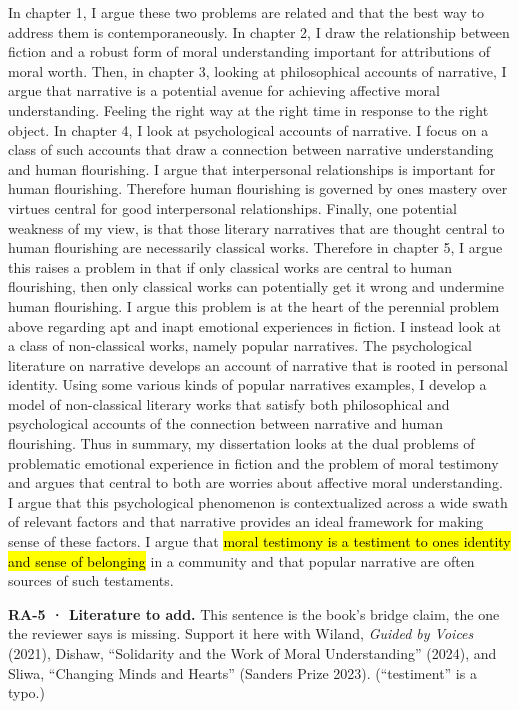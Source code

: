 \documentclass[
  letterpaper,
  DIV=11,
  numbers=noendperiod]{scrartcl}
\theoremstyle{remark}
\begin{document}
In chapter 1, I argue these two problems are related and that the best
way to address them is contemporaneously. In chapter 2, I draw the
relationship between fiction and a robust form of moral understanding
important for attributions of moral worth. Then, in chapter 3, looking
at philosophical accounts of narrative, I argue that narrative is a
potential avenue for achieving affective moral understanding. Feeling
the right way at the right time in response to the right object. In
chapter 4, I look at psychological accounts of narrative. I focus on a
class of such accounts that draw a connection between narrative
understanding and human flourishing. I argue that interpersonal
relationships is important for human flourishing. Therefore human
flourishing is governed by ones mastery over virtues central for good
interpersonal relationships. Finally, one potential weakness of my view,
is that those literary narratives that are thought central to human
flourishing are necessarily classical works. Therefore in chapter 5, I
argue this raises a problem in that if only classical works are central
to human flourishing, then only classical works can potentially get it
wrong and undermine human flourishing. I argue this problem is at the
heart of the perennial problem above regarding apt and inapt emotional
experiences in fiction. I instead look at a class of non-classical
works, namely popular narratives. The psychological literature on
narrative develops an account of narrative that is rooted in personal
identity. Using some various kinds of popular narratives examples, I
develop a model of non-classical literary works that satisfy both
philosophical and psychological accounts of the connection between
narrative and human flourishing. Thus in summary, my dissertation looks
at the dual problems of problematic emotional experience in fiction and
the problem of moral testimony and argues that central to both are
worries about affective moral understanding. I argue that this
psychological phenomenon is contextualized across a wide swath of
relevant factors and that narrative provides an ideal framework for
making sense of these factors. I argue that \hl{moral testimony is a
testiment to ones identity and sense of belonging} in a community and
that popular narrative are often sources of such testaments.

\begin{tcolorbox}[enhanced jigsaw, arc=.35mm, bottomrule=.15mm, bottomtitle=1mm, breakable, colback=white, colbacktitle=quarto-callout-tip-color!10!white, colframe=quarto-callout-tip-color-frame, coltitle=black, left=2mm, leftrule=.75mm, opacityback=0, opacitybacktitle=0.6, rightrule=.15mm, title=\textcolor{quarto-callout-tip-color}{\faLightbulb}\hspace{0.5em}{Tip}, titlerule=0mm, toprule=.15mm, toptitle=1mm]

\textbf{RA-5 · Literature to add.} This sentence is the book's bridge
claim, the one the reviewer says is missing. Support it here with
Wiland, \emph{Guided by Voices} (2021), Dishaw, ``Solidarity and the
Work of Moral Understanding'' (2024), and Sliwa, ``Changing Minds and
Hearts'' (Sanders Prize 2023). (``testiment'' is a typo.)

\end{tcolorbox}
\end{document}
